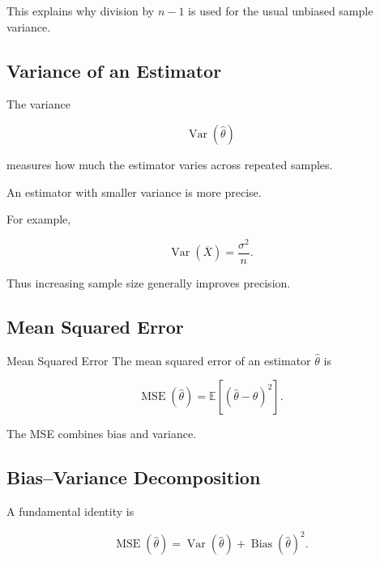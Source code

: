 This explains why division by \(n-1\) is used for the usual unbiased
sample variance.

\subsection{Variance of an Estimator}
\label{subsec:variance-estimator-estimation}

The variance

\[
\boxed{
\operatorname{Var}(\widehat{\theta})
}
\]

measures how much the estimator varies across repeated samples.

An estimator with smaller variance is more precise.

For example,

\[
\boxed{
\operatorname{Var}(\overline{X})
=
\frac{\sigma^2}{n}.
}
\]

Thus increasing sample size generally improves precision.

\subsection{Mean Squared Error}
\label{subsec:mse-estimation}

\begin{definitionbox}{Mean Squared Error}
The mean squared error of an estimator \(\widehat{\theta}\) is

\[
\boxed{
\operatorname{MSE}(\widehat{\theta})
=
\mathbb{E}
\left[
(\widehat{\theta}-\theta)^2
\right].
}
\]
\end{definitionbox}

The MSE combines bias and variance.

\subsection{Bias--Variance Decomposition}
\label{subsec:bias-variance-decomposition}

A fundamental identity is

\[
\boxed{
\operatorname{MSE}(\widehat{\theta})
=
\operatorname{Var}(\widehat{\theta})
+
\operatorname{Bias}(\widehat{\theta})^2.
}
\]

